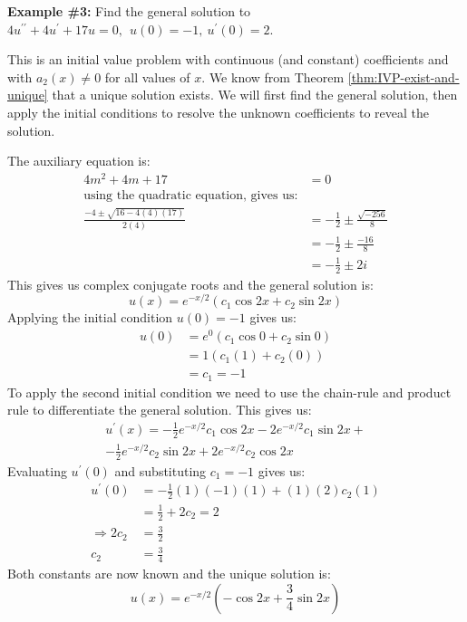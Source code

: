 \noindent\textbf{Example \#3:}
Find the general solution to $4u^{\prime \prime}+4u^{\prime} + 17u = 0, \ \ u(0)=-1, \ u^{\prime}(0)=2$.

This is an initial value problem with continuous (and constant) coefficients and with $a_2(x)\ne 0$ for all values of $x$.  We know from Theorem \ref{thm:IVP-exist-and-unique} that a unique solution exists.  We will first find the general solution, then apply the initial conditions to resolve the unknown coefficients to reveal the solution.

The auxiliary equation is:
\begin{align*}
4m^2+4m+17 &= 0 \\
\text{using the quadratic equation, gives us:} \\
\frac{-4 \pm \sqrt{16 - 4(4)(17)}}{2(4)} &= -\frac{1}{2} \pm \frac{\sqrt{-256}}{8}\\
&= -\frac{1}{2} \pm \frac{-16}{8} \\
&= -\frac{1}{2} \pm 2i
\end{align*}
This gives us complex conjugate roots and the general solution is:
\begin{equation*}
u(x) = e^{-x/2}\left(c_1 \cos{2x} + c_2 \sin{2x} \right)
\end{equation*}
Applying the initial condition $u(0)=-1$ gives us:
\begin{align*}
u(0) &= e^{0}\left(c_1 \cos{0} + c_2 \sin{0} \right) \\
&= 1(c_1(1)+c_2(0)) \\
&= c_1 = -1
\end{align*}
To apply the second initial condition we need to use the chain-rule and product rule to differentiate the general solution.  This gives us:
\begin{multline*}
u^{\prime}(x) = -\frac{1}{2}e^{-x/2}c_1\cos{2x}-2e^{-x/2}c_1\sin{2x} + \\
-\frac{1}{2}e^{-x/2}c_2\sin{2x}+2e^{-x/2}c_2\cos{2x}
\end{multline*}
Evaluating $u^{\prime}(0)$ and substituting $c_1 = -1$ gives us:
\begin{align*}
u^{\prime}(0) &= -\frac{1}{2}(1)(-1)(1) + (1)(2)c_2(1) \\
&= \frac{1}{2}+2c_2 = 2 \\
  \Rightarrow 2c_2 &= \frac{3}{2} \\
 c_2 &= \frac{3}{4}
\end{align*}
Both constants are now known and the unique solution is:
\begin{equation*}
u(x) = e^{-x/2}\left(-\cos{2x}+\frac{3}{4}\sin{2x} \right)
\end{equation*}
